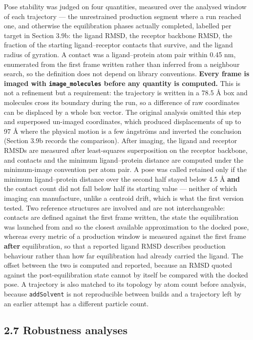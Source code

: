 \documentclass[utf8]{FrontiersinVancouver}
\begin{document}
Pose stability was judged on four quantities, measured over the analysed window of each trajectory --- the unrestrained production segment where a run reached one, and otherwise the equilibration phases actually completed, labelled per target in Section 3.9b: the ligand RMSD, the receptor backbone RMSD, the fraction of the starting ligand--receptor contacts that survive, and the ligand radius of gyration. A contact was a ligand--protein atom pair within 0.45 nm, enumerated from the first frame written rather than inferred from a neighbour search, so the definition does not depend on library conventions. \textbf{Every frame is imaged with \texttt{image\_molecules} before any quantity is computed.} This is not a refinement but a requirement: the trajectory is written in a 78.5 \AA{} box and molecules cross its boundary during the run, so a difference of raw coordinates can be displaced by a whole box vector. The original analysis omitted this step and superposed un-imaged coordinates, which produced displacements of up to 97 \AA{} where the physical motion is a few \aa{}ngströms and inverted the conclusion (Section 3.9b records the comparison). After imaging, the ligand and receptor RMSDs are measured after least-squares superposition on the receptor backbone, and contacts and the minimum ligand--protein distance are computed under the minimum-image convention per atom pair. A pose was called retained only if the minimum ligand--protein distance over the second half stayed below 4.5 \AA{} \textbf{and} the contact count did not fall below half its starting value --- neither of which imaging can manufacture, unlike a centroid drift, which is what the first version tested. Two reference structures are involved and are not interchangeable: contacts are defined against the first frame written, the state the equilibration was launched from and so the closest available approximation to the docked pose, whereas every metric of a production window is measured against the first frame \textbf{after} equilibration, so that a reported ligand RMSD describes production behaviour rather than how far equilibration had already carried the ligand. The offset between the two is computed and reported, because an RMSD quoted against the post-equilibration state cannot by itself be compared with the docked pose. A trajectory is also matched to its topology by atom count before analysis, because \texttt{addSolvent} is not reproducible between builds and a trajectory left by an earlier attempt has a different particle count.

\subsection{2.7 Robustness analyses}
\end{document}
